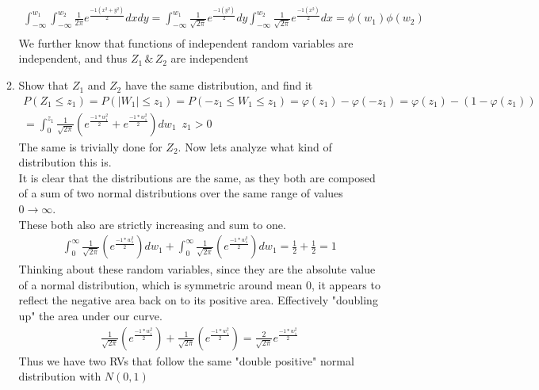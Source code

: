 \documentclass[11pt]{article}
\begin{document}
\begin{enumerate}
\begin{enumerate}
	\begin{gather}
		\int_{-\infty}^{w_1}\int_{-\infty}^{w_2} \frac{1}{2\pi}e^{\frac{-1(x^2+y^2)}{2}}dxdy = \int_{-\infty}^{w_1}\frac{1}{\sqrt{2\pi}}e^{\frac{-1(y^2)}{2}}dy\int_{-\infty}^{w_2} \frac{1}{\sqrt{2\pi}}e^{\frac{-1(x^2)}{2}}dx =\phi(w_1)\phi(w_2)\\
	\end{gather}
	We further know that functions of independent random variables are independent, and thus $Z_1 \, \& \, Z_2$ are independent
	\item Show that $Z_1$ and $Z_2$ have the same distribution, and find it
	\begin{gather}
		P(Z_1\le z_1) = P(|W_1|\le z_1) = P( -z_1 \le W_1 \le z_1) = \varphi(z_1) - \varphi(-z_1) = \varphi(z_1) - (1- \varphi(z_1))\\
		= \int_{0}^{z_1}\frac{1}{\sqrt{2\pi}}(e^\frac{-1*w_1^2}{2} + e^\frac{-1*w_1^2}{2})dw_1 \, \, \, z_1>0
	\end{gather}
	The same is trivially done for $Z_2$. Now lets analyze what kind of distribution this is.\\
	It is clear that the distributions are the same, as they both are composed of a sum of two normal distributions over the same range of values $0 \rightarrow \infty$.\\
	These both also are strictly increasing and sum to one.\\
	\begin{gather}
		\int_{0}^{\infty}\frac{1}{\sqrt{2\pi}}(e^\frac{-1*w_1^2}{2})dw_1 + \int_{0}^{\infty}\frac{1}{\sqrt{2\pi}}(e^\frac{-1*w_1^2}{2})dw_1 = \frac{1}{2} + \frac{1}{2} = 1
	\end{gather} Thinking about these random variables, since they are the absolute value of a normal distribution, which is symmetric around mean 0, it appears to reflect the negative area back on to its positive area. Effectively "doubling up" the area under our curve.
	\begin{gather}
	\frac{1}{\sqrt{2\pi}}(e^\frac{-1*w_1^2}{2}) + \frac{1}{\sqrt{2\pi}}(e^\frac{-1*w_1^2}{2}) =
		\frac{2}{\sqrt{2\pi}} e^\frac{-1*w_1^2}{2}
	\end{gather}
	Thus we have two RVs that follow the same "double positive" normal distribution with $N(0,1)$
\end{enumerate}
\end{enumerate}
\end{document}
